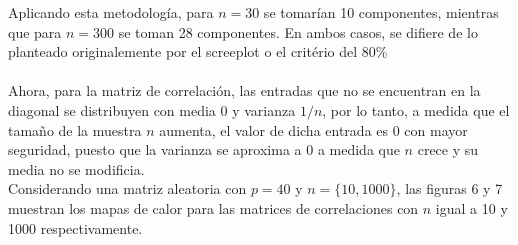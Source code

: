 \documentclass[paper=letter, fontsize=14pt]{scrartcl}
\numberwithin{equation}{section} %
\numberwithin{figure}{section} %
\numberwithin{table}{section} %
\begin{document}
Aplicando esta metodología, para $n=30$ se tomarían 10 componentes, mientras que para $n=300$ se toman 28 componentes. En ambos casos, se difiere de lo planteado originalemente por el screeplot o el critério del 80\%\\
\\


Ahora, para la matriz de correlación, las entradas que no se encuentran en la diagonal se distribuyen con media 0 y varianza $1/n$, por lo tanto, a medida que el tamaño de la muestra $n$ aumenta, el valor de dicha entrada es 0 con mayor seguridad, puesto que la varianza se aproxima a 0 a medida que $n$ crece y su media no se modificia.\\

Considerando una matriz aleatoria con $p=40$ y $n=\lbrace10,1000\rbrace$, las figuras 6 y 7 muestran los mapas de calor para las matrices de correlaciones con $n$ igual a 10 y 1000 respectivamente.
\end{document}
